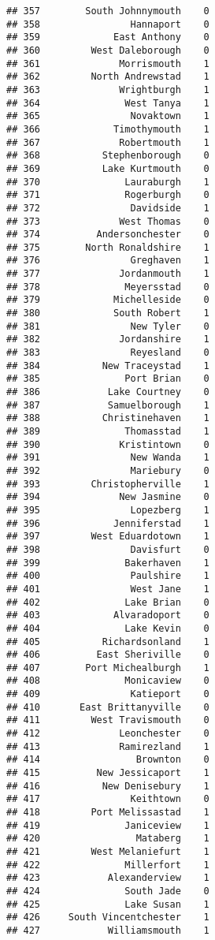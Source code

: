 \documentclass[
]{article}
\begin{document}
\begin{verbatim}
## 357        South Johnnymouth    0
## 358                Hannaport    0
## 359             East Anthony    0
## 360         West Daleborough    0
## 361              Morrismouth    1
## 362         North Andrewstad    1
## 363              Wrightburgh    1
## 364               West Tanya    1
## 365                Novaktown    1
## 366             Timothymouth    1
## 367              Robertmouth    1
## 368           Stephenborough    0
## 369           Lake Kurtmouth    0
## 370               Lauraburgh    1
## 371               Rogerburgh    0
## 372                Davidside    1
## 373              West Thomas    0
## 374          Andersonchester    0
## 375        North Ronaldshire    1
## 376                Greghaven    1
## 377              Jordanmouth    1
## 378               Meyersstad    0
## 379             Michelleside    0
## 380             South Robert    1
## 381                New Tyler    0
## 382              Jordanshire    1
## 383                Reyesland    0
## 384           New Traceystad    1
## 385               Port Brian    0
## 386            Lake Courtney    0
## 387            Samuelborough    1
## 388           Christinehaven    1
## 389               Thomasstad    1
## 390              Kristintown    0
## 391                New Wanda    1
## 392                Mariebury    0
## 393         Christopherville    1
## 394              New Jasmine    0
## 395                Lopezberg    1
## 396             Jenniferstad    1
## 397         West Eduardotown    1
## 398                Davisfurt    0
## 399               Bakerhaven    1
## 400                Paulshire    1
## 401                West Jane    1
## 402               Lake Brian    0
## 403             Alvaradoport    0
## 404               Lake Kevin    0
## 405           Richardsonland    1
## 406          East Sheriville    0
## 407        Port Michealburgh    1
## 408               Monicaview    0
## 409                Katieport    0
## 410       East Brittanyville    0
## 411         West Travismouth    0
## 412              Leonchester    0
## 413              Ramirezland    1
## 414                 Brownton    0
## 415          New Jessicaport    1
## 416           New Denisebury    1
## 417                Keithtown    0
## 418         Port Melissastad    1
## 419               Janiceview    1
## 420                 Mataberg    1
## 421         West Melaniefurt    1
## 422               Millerfort    1
## 423            Alexanderview    1
## 424               South Jade    0
## 425               Lake Susan    1
## 426     South Vincentchester    1
## 427            Williamsmouth    1

\end{verbatim}
\end{document}
